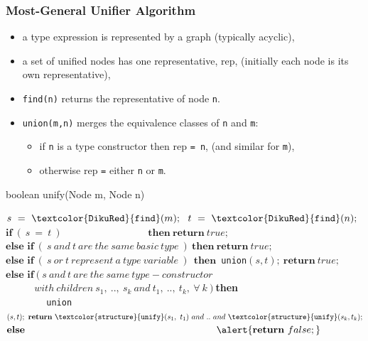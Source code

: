 \documentclass{beamer}
\renewcommand{\emph}[1]{\textcolor{structure}{#1}}
\newcommand{\emp}[1]{\textcolor{DikuRed}{ #1}}
\begin{document}
\begin{frame}[fragile,t]
   \frametitle{Most-General Unifier Algorithm}


\begin{itemize}
    \item a type expression is represented by a graph (typically acyclic),

    \item a set of unified nodes has one representative, {\sc rep},
            (initially each node is its own representative),

    \item \emp{{\tt find(n)}} returns the representative of node {\tt n}.

    \item \emp{{\tt union(m,n)}} merges the equivalence classes of {\tt n} and {\tt m}:
        \begin{itemize}
            \item if {\tt n} is a type constructor then {\sc rep} {\tt = n}, (and similar for {\tt m}),
            \item otherwise {\sc rep} {\tt=} either {\tt n} or {\tt m}.
        \end{itemize}
\end{itemize}

\begin{block}{boolean unify(Node m, Node n)}
\begin{footnotesize}
$s~=~{\tt\emp{find}}(m);~~t~=~{\tt\emp{find}}(n);$\\
$\textbf{if}~(~s~=~t~)~~~~~~~~~~~~~~~~~~~~~~~~~~~~~~~~~~~~~~~\textbf{then}~\textbf{return}~true;$\\
$\textbf{else~if}~(~s~and~t~are~the~same~basic~type~)~\textbf{then}~\textbf{return}~true;$\\
$\textbf{else~if}~(~s~or~t~represent~a~type~variable~)~~\textbf{then}${\tt~union}$(s,t);~\textbf{return}~true;$
$\textbf{else~if}~(~s~and~t~are~the~same~type-constructor$\\
$~~~~~~~~~~~~~with~children~s_1,~..,~s_k~and~t_1,~..,~t_k,~\forall~k~)~$\textbf{then}\\
{\tt~~~~~~~\emp{union}}$(s,t);~\textbf{return}~{\tt \emph{unify}}(s_1,~t_1)~and~..~and~{\tt \emph{unify}}(s_k ,t_k);$\\
$\textbf{else}~~~~~~~~~~~~~~~~~~~~~~~~~~~~~~~~~~~~~~~~~~~~~~~~~~~~~~~~~~\alert{\textbf{return}~false;}$
\end{footnotesize}
\end{block}

\end{frame}
\end{document}
